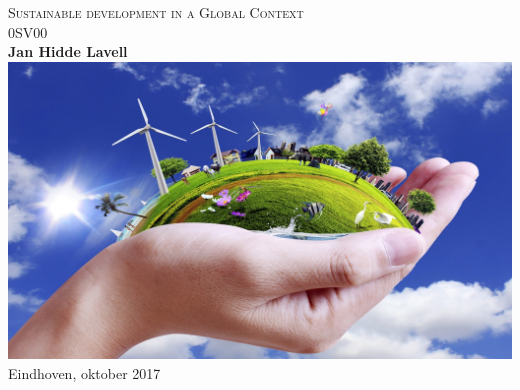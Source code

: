 \documentclass[a4paper,11pt]{report}
\begin{document}
\begin{titlepage}
    \centering
    \vfill
    {\huge
        \textsc{Sustainable development in a Global Context}\\
        0SV00\\
        \vskip2cm
        \textbf{Jan Hidde Lavell}\\
    }    
    \vfill
    \includegraphics[width=17cm]{SD}  
    \vfill
    Eindhoven, oktober 2017
    \vfill			

\end{titlepage}

\clearpage

\tableofcontents

\clearpage

    




 


















\end{document}
